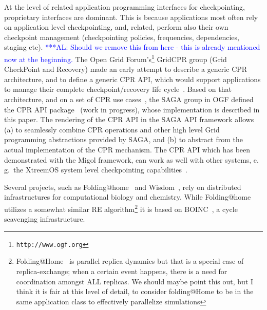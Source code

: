 \documentclass[conference,final]{IEEEtran}
\newcommand{\kimnote}[1]{ {\textcolor{green} { ***JK: #1 }}}
\newcommand{\alnote}[1]{ {\textcolor{blue} { ***AL: #1 }}}
\newcommand{\jhanote}[1]{ {\textcolor{red} { ***SJ: #1 }}}
\newcommand{\kimnote}[1]{}
\newcommand{\alnote}[1]{}
\newcommand{\jhanote}[1]{}
\begin{document}
At the level of related application programming interfaces for
checkpointing, proprietary interfaces are dominant. This is because
applications most often rely on application level checkpointing, and,
related, perform also their own checkpoint management (checkpointing
policies, frequencies, dependencies, staging etc).  \alnote{Should we
  remove this from here - this is already mentioned now at the
  beginning.}  The Open Grid
Forum's\footnote{\texttt{http://www.ogf.org}} GridCPR group (Grid
CheckPoint and Recovery) made an early attempt to describe a generic
CPR architecture, and to define a generic CPR API, which would support
applications to manage their complete checkpoint/recovery life
cycle~\cite{ogf_cpr_arch}.  Based on that architecture, and on a set
of CPR use cases~\cite{ogf_cpr_uc}, the SAGA group in OGF defined the
CPR API package~\cite{saga_cpr_draft} (work in progress), whose
implementation is described in this paper.  The rendering of the CPR
API in the SAGA API framework allows (a) to seamlessly combine CPR
operations and other high level Grid programming abstractions provided
by SAGA, and (b) to abstract from the actual implementation of the CPR
mechanism.  The CPR API which has been demonstrated with the Migol
framework, can work as well with other systems, e.\,g.\,
the XtreemOS system level checkpointing
capabilities~\cite{xtreemos_cpr}.


Several projects, such as Folding@home~\cite{folding} and
Wisdom~\cite{wisdom}, rely on distributed infrastructures for
computational biology and chemistry. While
Folding@home~\cite{PhysRevLett.86.4983} utilizes a somewhat similar RE
algorithm\footnote{Folding@Home~\cite{PhysRevLett.86.4983} is parallel
  replica dynamics but that is a special case of replica-exchange;
  when a certain event happens, there is a need for coordination
  amongst ALL replicas. We should maybe point this out, but I think it
  is fair at this level of detail, to consider folding@Home to be in
  the same application class to effectively parallelize simulations}
it is based on BOINC~\cite{1033223}, a cycle scavenging
infrastructure.

\end{document}
